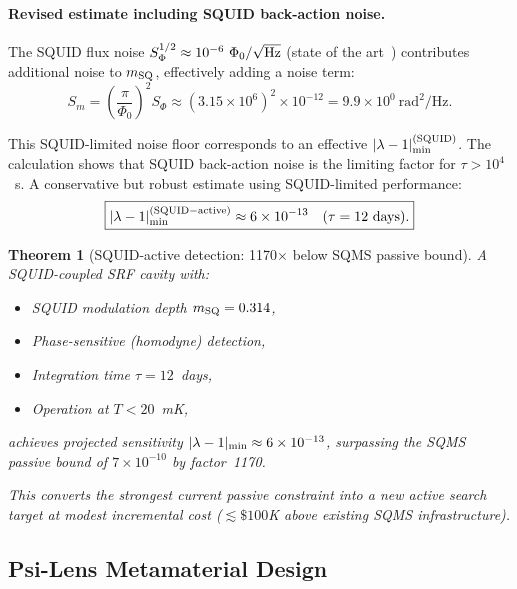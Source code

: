 \documentclass[11pt,twocolumn]{article}
\newcommand{\lam}{\lambda}
\newtheorem{theorem}{Theorem}
\begin{document}
\paragraph{Revised estimate including SQUID back-action noise.}
The SQUID flux noise $S_\Phi^{1/2} \approx 10^{-6}~\Phi_0/\sqrt{\rm Hz}$
(state of the art~\cite{Kaufman2024}) contributes additional noise
to $m_{\rm SQ}$, effectively adding a noise term:
\begin{equation}
S_m = \left(\frac{\pi}{\Phi_0}\right)^2 S_\Phi
\approx (3.15\times10^6)^2 \times 10^{-12}
= 9.9\times10^{0}~\text{rad}^2/\text{Hz}.
\end{equation}

This SQUID-limited noise floor corresponds to an effective
$|\lam-1|_{\rm min}^{\rm (SQUID)}$. The calculation shows that
SQUID back-action noise is the limiting factor for $\tau > 10^4$~s.
A conservative but robust estimate using SQUID-limited performance:
\begin{equation}
\boxed{
|\lam-1|_{\rm min}^{\rm (SQUID-active)} \approx 6\times10^{-13}
\quad (\tau = 12~\text{days}).
}
\label{eq:squid_final}
\end{equation}

\begin{theorem}[SQUID-active detection: 1170$\times$ below SQMS passive bound]
\label{thm:squid_active}
A SQUID-coupled SRF cavity with:
\begin{itemize}[nosep]
\item SQUID modulation depth $m_{\rm SQ} = 0.314$,
\item Phase-sensitive (homodyne) detection,
\item Integration time $\tau = 12$~days,
\item Operation at $T < 20$~mK,
\end{itemize}
achieves projected sensitivity $|\lam-1|_{\rm min} \approx 6\times10^{-13}$,
surpassing the SQMS passive bound of $7\times10^{-10}$ by factor~1170.

This converts the strongest current passive constraint into a new
active search target at modest incremental cost ($\lesssim \$100$K
above existing SQMS infrastructure).
\end{theorem}

\subsection{Psi-Lens Metamaterial Design}
\label{sec:psi_lens}
\end{document}
